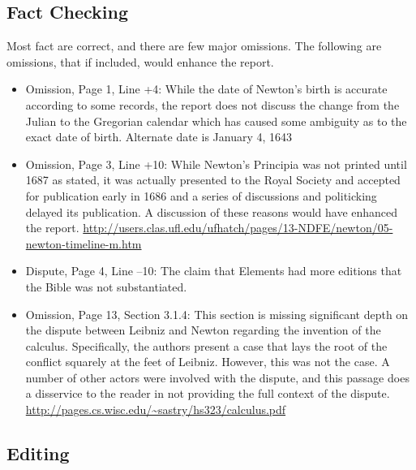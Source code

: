 \documentclass[11pt]{article}
\begin{document}
\subsection*{Fact Checking}
Most fact are correct, and there are few major omissions. The following are omissions, that if included, would enhance the report.
\begin{itemize}
\item Omission, Page 1, Line +4: While the date of Newton's birth is accurate according to some records, the report does not discuss the change from the Julian to the Gregorian calendar which has caused some ambiguity as to the exact date of birth. Alternate date is January 4, 1643

\item Omission, Page 3, Line +10: While Newton's Principia was not printed until 1687 as stated, it was actually presented to the Royal Society and accepted for publication early in 1686 and a series of discussions and politicking delayed its publication. A discussion of these reasons would have enhanced the report. \url{http://users.clas.ufl.edu/ufhatch/pages/13-NDFE/newton/05-newton-timeline-m.htm}
\item Dispute, Page 4, Line --10: The claim that Elements had more editions that the Bible was not substantiated.
\item Omission, Page 13, Section 3.1.4: This section is missing significant depth on the dispute between Leibniz and Newton regarding the invention of the calculus. Specifically, the authors present a case that lays the root of the conflict squarely at the feet of Leibniz. However, this was not the case. A number of other actors were involved with the dispute, and this passage does a disservice to the reader in not providing the full context of the dispute. \url{http://pages.cs.wisc.edu/~sastry/hs323/calculus.pdf}
\end{itemize}

\subsection*{Editing}
\end{document}

